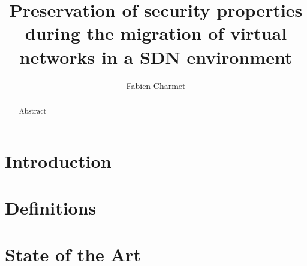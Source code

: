 \documentclass[a4paper, 11pt]{article}
\title{\LARGE \bf Preservation of security properties during the migration of virtual networks in a SDN environment}
\author{Fabien Charmet}
\newcommand{\boxedtext}[1]{\fbox{\scriptsize\bfseries\textsf{#1}}}
\newcommand{\myremark}[2]{
   \textcolor{blue}{\boxedtext{#1}
      {\small$\blacktriangleright$\emph{\textsl{#2}}$\blacktriangleleft$}
}}
\newcommand\FC[1]{\myremark{FC}{#1}}
\begin{document}

\maketitle

\begin{abstract}
Abstract
\end{abstract}

\tableofcontents
\listoffigures
 \listoftables
\thispagestyle{empty}


\newpage
{}
\section{Introduction}

 

\newpage
\section{Definitions}
\label{sec:basic_def}


\newpage
\section{State of the Art}
\label{sec:sota}

\end{document}
